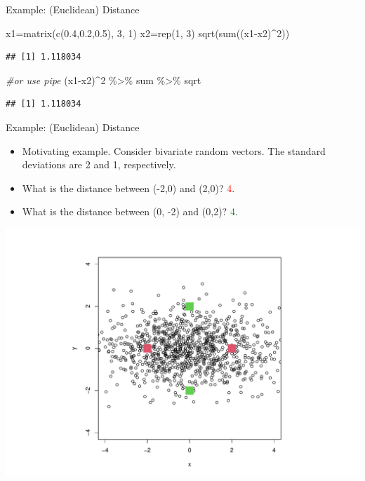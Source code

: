 \documentclass[
  ignorenonframetext,
]{beamer}
\newenvironment{Shaded}{\begin{snugshade}}{\end{snugshade}}
\newcommand{\CommentTok}[1]{\textcolor[rgb]{0.56,0.35,0.01}{\textit{#1}}}
\newcommand{\DecValTok}[1]{\textcolor[rgb]{0.00,0.00,0.81}{#1}}
\newcommand{\FloatTok}[1]{\textcolor[rgb]{0.00,0.00,0.81}{#1}}
\newcommand{\FunctionTok}[1]{\textcolor[rgb]{0.00,0.00,0.00}{#1}}
\newcommand{\NormalTok}[1]{#1}
\newcommand{\OtherTok}[1]{\textcolor[rgb]{0.56,0.35,0.01}{#1}}
\newcommand{\SpecialCharTok}[1]{\textcolor[rgb]{0.00,0.00,0.00}{#1}}
\providecommand{\tightlist}{%
  \setlength{\itemsep}{0pt}\setlength{\parskip}{0pt}}
\begin{document}
\begin{frame}[fragile]{Example: (Euclidean) Distance}
\protect\hypertarget{example-euclidean-distance}{}
\begin{Shaded}
\begin{Highlighting}[]
\NormalTok{x1}\OtherTok{=}\FunctionTok{matrix}\NormalTok{(}\FunctionTok{c}\NormalTok{(}\FloatTok{0.4}\NormalTok{,}\FloatTok{0.2}\NormalTok{,}\FloatTok{0.5}\NormalTok{), }\DecValTok{3}\NormalTok{, }\DecValTok{1}\NormalTok{)}
\NormalTok{x2}\OtherTok{=}\FunctionTok{rep}\NormalTok{(}\DecValTok{1}\NormalTok{, }\DecValTok{3}\NormalTok{)}
\FunctionTok{sqrt}\NormalTok{(}\FunctionTok{sum}\NormalTok{((x1}\SpecialCharTok{{-}}\NormalTok{x2)}\SpecialCharTok{\^{}}\DecValTok{2}\NormalTok{))}
\end{Highlighting}
\end{Shaded}

\begin{verbatim}
## [1] 1.118034
\end{verbatim}

\begin{Shaded}
\begin{Highlighting}[]
\CommentTok{\#or use pipe}
\NormalTok{(x1}\SpecialCharTok{{-}}\NormalTok{x2)}\SpecialCharTok{\^{}}\DecValTok{2} \SpecialCharTok{\%\textgreater{}\%}\NormalTok{ sum }\SpecialCharTok{\%\textgreater{}\%}\NormalTok{ sqrt}
\end{Highlighting}
\end{Shaded}

\begin{verbatim}
## [1] 1.118034
\end{verbatim}
\end{frame}

\begin{frame}{Example: (Euclidean) Distance}
\protect\hypertarget{example-euclidean-distance-1}{}
\begin{itemize}
\tightlist
\item
  Motivating example. Consider bivariate random vectors. The standard
  deviations are 2 and 1, respectively.
\item
  What is the distance between (-2,0) and (2,0)? \textcolor{red}{4}.
\item
  What is the distance between (0, -2) and (0,2)? \textcolor{green}{4}.
\end{itemize}

\includegraphics[width=0.6\linewidth]{Introduction_files/figure-beamer/unnamed-chunk-21-1}
\end{frame}
\end{document}
